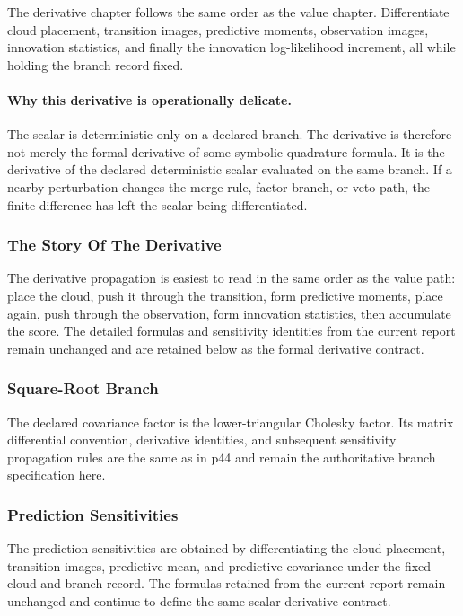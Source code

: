\documentclass[11pt]{article}
\numberwithin{equation}{section}
\begin{document}
The derivative chapter follows the same order as the value chapter.  Differentiate
cloud placement, transition images, predictive moments, observation images,
innovation statistics, and finally the innovation log-likelihood increment, all
while holding the branch record fixed.

\paragraph{Why this derivative is operationally delicate.}
The scalar is deterministic only on a declared branch.  The derivative is
therefore not merely the formal derivative of some symbolic quadrature formula.
It is the derivative of the declared deterministic scalar evaluated on the same
branch.  If a nearby perturbation changes the merge rule, factor branch, or veto
path, the finite difference has left the scalar being differentiated.

\subsubsection{The Story Of The Derivative}
The derivative propagation is easiest to read in the same order as the value path:
place the cloud, push it through the transition, form predictive moments, place
again, push through the observation, form innovation statistics, then
accumulate the score.  The detailed formulas and sensitivity identities from the
current report remain unchanged and are retained below as the formal derivative
contract.

\subsubsection{Square-Root Branch}
\label{subsec:p31-square-root-branch}

The declared covariance factor is the lower-triangular Cholesky factor.  Its
matrix differential convention, derivative identities, and subsequent sensitivity
propagation rules are the same as in p44 and remain the authoritative branch
specification here.

\subsubsection{Prediction Sensitivities}
\label{subsec:p31-prediction-sensitivities}

The prediction sensitivities are obtained by differentiating the cloud placement,
transition images, predictive mean, and predictive covariance under the fixed
cloud and branch record.  The formulas retained from the current report remain
unchanged and continue to define the same-scalar derivative contract.
\end{document}
